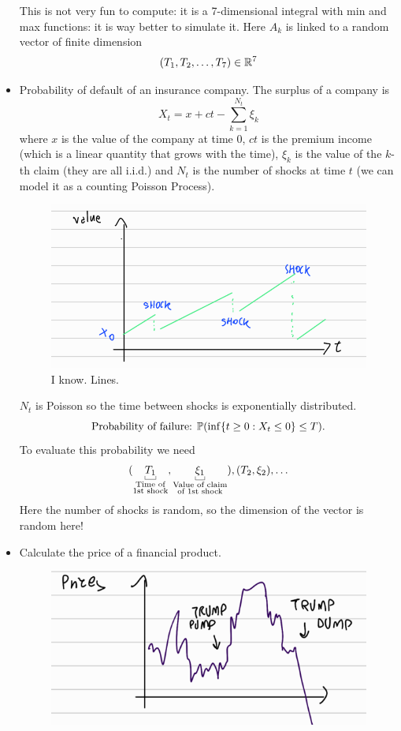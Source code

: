 \documentclass[12pt]{report}
\begin{document}
\begin{itemize}
\begin{equation*}
	\end{equation*}
	This is not very fun to compute: it is a 7-dimensional integral with min and max functions: it is way better to simulate it. Here $A_{k}$ is linked to a random vector of finite dimension
	\begin{equation*}
		(T_{1},T_{2},\ldots,T_{7})\in\mathbb{R}^{7}
	\end{equation*}
	\item Probability of default of an insurance company. The surplus of a company is 
	\begin{equation*}
		X_{t}=x+ct-\sum_{k=1}^{N_{t}}\xi_{k}
	\end{equation*}
	where $x$ is the value of the company at time 0, $ct$ is the premium income (which is a linear quantity that grows with the time), $\xi_{k}$ is the value of the $k$-th claim (they are all i.i.d.) and $N_{t}$ is the number of shocks at time $t$ (we can model it as a counting Poisson Process).
	\begin{figure}[H]
		\centering
		\includegraphics[width=0.5\linewidth]{img/screenshot059}
		\caption{I know. Lines.}
		\label{fig:screenshot059}
	\end{figure}
	$N_{t}$ is Poisson so the time between shocks is exponentially distributed.
	\begin{equation*}
		\text{Probability of failure: }\mathbb{P}(\inf\{t\geq0:X_{t}\leq0\}\leq T).
	\end{equation*}
	To evaluate this probability we need
	\begin{equation*}
		(\ubracketthin{T_{1}}_{{\substack{\text{Time of}\\\text{1st shock}}}},\ubracketthin{\xi_{1}}_{\substack{\text{Value of claim}\\\text{of 1st shock}}}), (T_{2},\xi_{2}),\ldots
	\end{equation*}
	Here the number of shocks is random, so the dimension of the vector is random here!
	\item Calculate the price of a financial product.
	\begin{figure}[H]
		\centering
		\includegraphics[width=0.5\linewidth]{img/screenshot060}

\end{figure}
\end{itemize}
\end{document}
